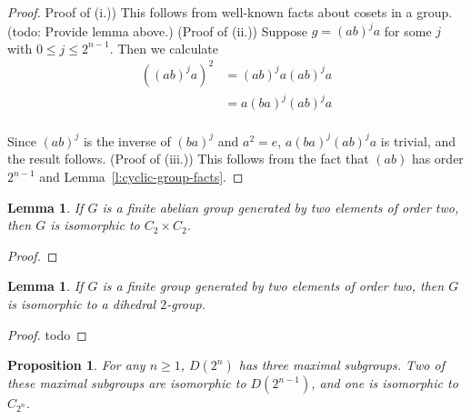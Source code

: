 \documentclass{amsart}
\numberwithin{equation} {section}
\newtheorem{lemma}[equation]{Lemma}
\newtheorem{proposition}[equation]{Proposition}
\theoremstyle{definition}
\begin{document}
\begin{proof}
Proof of (i.)) This follows from well-known facts about cosets in a group. (todo: Provide lemma above.) 
(Proof of (ii.)) Suppose $g = (ab)^ja$ for some $j$ with $0 \leq j \leq 2^{n-1}$. Then we calculate
\begin{align*}
((ab)^j a)^2 &= (ab)^j a (ab)^j a \\
&= a (ba)^j (ab)^j a \\
\end{align*}

Since $(ab)^j$ is the inverse of $(ba)^j$ and $a^2 = e$,  $a (ba)^j (ab)^j a$ is trivial, and the result follows. (Proof of (iii.)) This follows from the fact that $(ab)$ has order $2^{n-1}$ and Lemma~\ref{l:cyclic-group-facts}.
\end{proof}




\begin{lemma}\label{l:C2-C2-structure-lemma}
If $G$ is a finite abelian group generated by two elements of order two, then $G$ is isomorphic to $C_2 \times C_2$. 
\end{lemma}

\begin{proof}
 
\end{proof}

\begin{lemma}\label{l:dihedral-structure-lemma}
If $G$ is a finite group generated by two elements of order two, then $G$ is isomorphic to a dihedral $2$-group. 
\end{lemma}

\begin{proof}
todo
\end{proof}

\begin{proposition}\label{p:dihedral-maximal-subgroups}
For any $n \geq 1$, $D(2^n)$ has three maximal subgroups. Two of these maximal subgroups are isomorphic to $D(2^{n-1})$, and one is isomorphic to $C_{2^n}$.
\end{proposition}
\end{document}

